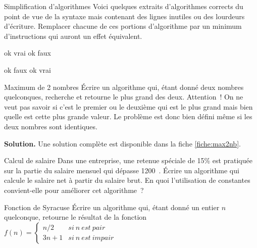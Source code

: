 	\begin{Exercice}{Simplification d’algorithmes}
		Voici quelques extraits d’algorithmes corrects du point de vue de la
		syntaxe mais contenant des lignes inutiles ou des lourdeurs d’écriture.
		Remplacer chacune de ces portions d’algorithme par un minimum
		d’instructions qui auront un effet équivalent.
	
		\begin{minipage}[t]{7cm}
			\begin{LDA}
				\Let ok \Gets vrai
			\Else
				\Let ok \Gets faux
			\EndIf
			\end{LDA}
		\end{minipage}
		\quad
		\begin{minipage}[t]{7cm}		
			\begin{LDA}
			\If{a $>$ b}
				\Let ok \Gets faux
			\Else
				\If{a $\leq$ b}
					\Let ok \Gets vrai
				\EndIf
			\EndIf
			\end{LDA}
		\end{minipage}
	\end{Exercice}

	\begin{Exercice}{Maximum de 2 nombres}
		Écrire un algorithme qui, étant donné deux nombres quelconques,
		recherche et retourne le plus grand des deux. Attention~! On ne veut
		pas savoir si c’est le premier ou le deuxième qui est
		le plus grand mais bien quelle est cette plus grande valeur. Le
		problème est donc bien défini même si les deux nombres sont
		identiques.
		
		\textbf{Solution.}
		Une solution complète est disponible dans la fiche \vref{fiche:max2nb}.
	\end{Exercice}
	
	\begin{Exercice}{Calcul de salaire}
		Dans une entreprise, 
		une retenue spéciale de 15\% est pratiquée 
		sur la partie du salaire mensuel qui dépasse 1200~\texteuro. 
		Écrire un algorithme qui calcule le salaire net à partir du salaire brut. 
		En quoi l’utilisation de constantes convient-elle pour améliorer cet algorithme~?
	\end{Exercice}

	\begin{Exercice}{Fonction de Syracuse}
		Écrire un algorithme qui, étant donné un entier $n$ quelconque,
		retourne le résultat de la fonction
		$f(n)=
			\left\{
			\begin{array}{rl}
				n/2 & si \ n \ est\ pair\\
				3n+1 & si \ n \ est \ impair
			\end{array}
			\right.$
	\end{Exercice}

